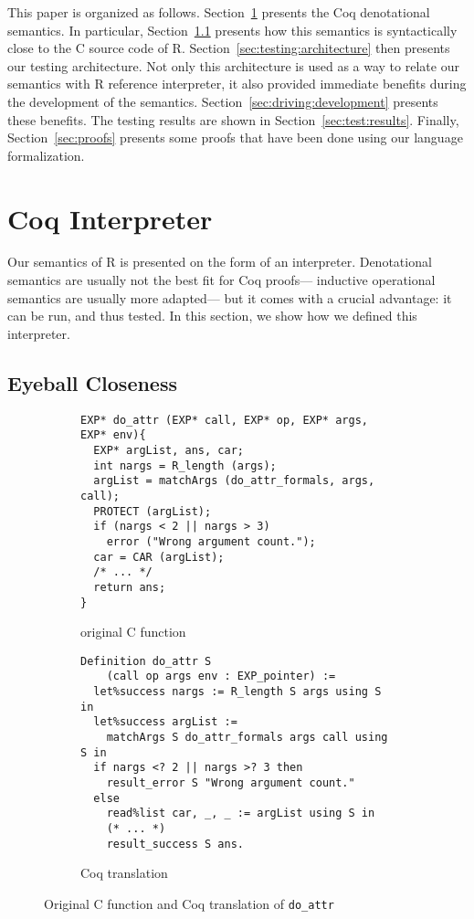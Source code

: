\documentclass[
    sigplan,
    10pt,
    review, %
    natbib=false %
 ]{acmart}
\begin{document}
This paper is organized as follows.
Section~\ref{sec:coq:interp} presents the Coq denotational semantics.
In particular, Section~\ref{sec:eyeball:closeness} presents
how this semantics is syntactically close to the C source code of R.
Section~\ref{sec:testing:architecture} then presents our testing architecture.
Not only this architecture is used as a way to relate our semantics
with R reference interpreter,
it also provided immediate benefits during the development of the semantics.
Section~\ref{sec:driving:development} presents these benefits.
The testing results are shown in Section~\ref{sec:test:results}.
Finally, Section~\ref{sec:proofs} presents some proofs that have been done
using our language formalization.

\section{Coq Interpreter}
\label{sec:coq:interp}

Our semantics of R is presented on the form of an interpreter.
Denotational semantics are usually not the best fit for Coq proofs---%
inductive operational semantics are usually more adapted---%
but it comes with a crucial advantage:
it can be run, and thus tested.
In this section, we show how we defined this interpreter.

\subsection{Eyeball Closeness}
\label{sec:eyeball:closeness}

\begin{figure*}
    \centering{}
\begin{subfigure}{.55\textwidth}
\begin{verbatim}
EXP* do_attr (EXP* call, EXP* op, EXP* args, EXP* env){
  EXP* argList, ans, car;
  int nargs = R_length (args);
  argList = matchArgs (do_attr_formals, args, call);
  PROTECT (argList);
  if (nargs < 2 || nargs > 3)
    error ("Wrong argument count.");
  car = CAR (argList);
  /* ... */
  return ans;
}
\end{verbatim}
    \caption{original C function}
    \label{fig:c:do_attr}
\end{subfigure}
\begin{subfigure}{.44\textwidth}
\begin{verbatim}
Definition do_attr S
    (call op args env : EXP_pointer) :=
  let%success nargs := R_length S args using S in
  let%success argList :=
    matchArgs S do_attr_formals args call using S in
  if nargs <? 2 || nargs >? 3 then
    result_error S "Wrong argument count."
  else
    read%list car, _, _ := argList using S in
    (* ... *)
    result_success S ans.
\end{verbatim}
    \caption{Coq translation}
    \label{fig:coq:do_attr}
\end{subfigure}
    \caption{Original C function and Coq translation of \texttt{do_attr}}
    \label{fig:do_attr}
\end{figure*}
\end{document}
